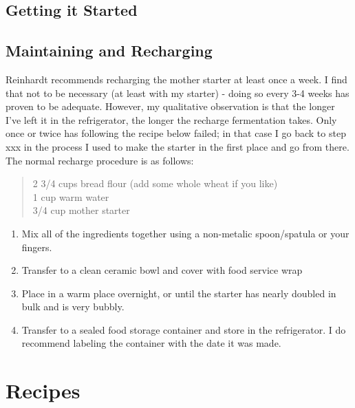 \documentclass[
]{book}
\providecommand{\tightlist}{%
  \setlength{\itemsep}{0pt}\setlength{\parskip}{0pt}}
\begin{document}
\hypertarget{getting-it-started}{%
\subsection{Getting it Started}\label{getting-it-started}}

\hypertarget{maintaining-and-recharging}{%
\subsection{Maintaining and Recharging}\label{maintaining-and-recharging}}

Reinhardt recommends recharging the mother starter at least once a week. I find that not to be necessary (at least with my starter) - doing so every 3-4 weeks has proven to be adequate. However, my qualitative observation is that the longer I've left it in the refrigerator, the longer the recharge fermentation takes. Only once or twice has following the recipe below failed; in that case I go back to step xxx in the process I used to make the starter in the first place and go from there. The normal recharge procedure is as follows:

\begin{quote}
2 3/4 cups bread flour (add some whole wheat if you like)\\
1 cup warm water\\
3/4 cup mother starter
\end{quote}

\begin{enumerate}
\def\labelenumi{\arabic{enumi}.}
\tightlist
\item
  Mix all of the ingredients together using a non-metalic spoon/spatula or your fingers.\\
\item
  Transfer to a clean ceramic bowl and cover with food service wrap
\item
  Place in a warm place overnight, or until the starter has nearly doubled in bulk and is very bubbly.
\item
  Transfer to a sealed food storage container and store in the refrigerator. I do recommend labeling the container with the date it was made.
\end{enumerate}

\hypertarget{recipes}{%
\section{Recipes}\label{recipes}}
\end{document}
